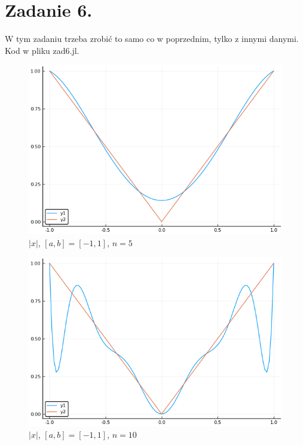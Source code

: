 \documentclass{article}
\begin{document}
\section{Zadanie 6.}
W tym zadaniu trzeba zrobić to samo co w poprzednim, tylko z innymi danymi.
Kod w pliku zad6.jl.
\begin{figure}[H]
	\includegraphics[width=\linewidth]{zad6a_5.png}
	\caption{$|x|$, $[a,b]=[-1,1]$, $n=5$}
	\label{fig:5a5}
\end{figure}
\begin{figure}[H]
	\includegraphics[width=\linewidth]{zad6a_10.png}
	\caption{$|x|$, $[a,b]=[-1,1]$, $n=10$}
	\label{fig:5a5}
\end{figure}
\end{document}
